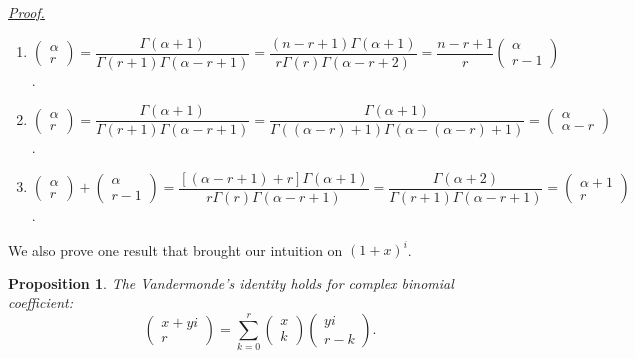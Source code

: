\documentclass[12pt]{article}
\newtheorem*{proposition}{Proposition}
\renewenvironment{proof}[1][Proof]{\begin{snugshade*} \underline{\textit{{#1}.}}\\}{\hfill \qedsymbol \end{snugshade*}}
\begin{document}
    \begin{proof}
        \begin{enumerate}
            \item $\begin{pmatrix}
                \alpha\\r
            \end{pmatrix}=\dfrac{\Gamma(\alpha+1)}{\Gamma(r+1)\Gamma(\alpha-r+1)}=\dfrac{(n-r+1)\Gamma(\alpha+1)}{r\Gamma(r)\Gamma(\alpha-r+2)}=\dfrac{n-r+1}{r}\begin{pmatrix}
                \alpha\\r-1
            \end{pmatrix}$.
            \item $\begin{pmatrix}
                \alpha\\r
            \end{pmatrix}=\dfrac{\Gamma(\alpha+1)}{\Gamma(r+1)\Gamma(\alpha-r+1)}=\dfrac{\Gamma(\alpha+1)}{\Gamma((\alpha-r)+1)\Gamma(\alpha-(\alpha-r)+1)}=\begin{pmatrix}
                \alpha\\\alpha-r
            \end{pmatrix}$.
            \item $\begin{pmatrix}
                \alpha\\r
            \end{pmatrix}+\begin{pmatrix}
                \alpha\\r-1
            \end{pmatrix}=\dfrac{[(\alpha-r+1)+r]\Gamma(\alpha+1)}{r\Gamma(r)\Gamma(\alpha-r+1)}=\dfrac{\Gamma(\alpha+2)}{\Gamma(r+1)\Gamma(\alpha-r+1)}=\begin{pmatrix}
                \alpha+1\\r
            \end{pmatrix}$.
        \end{enumerate}
    \end{proof}

    We also prove one result that brought our intuition on $(1+x)^i$.

    \begin{proposition}
        The Vandermonde's identity holds for complex binomial coefficient: \[\begin{pmatrix}
            x+yi\\r
        \end{pmatrix}=\sum_{k=0}^{r}\begin{pmatrix}
            x\\k
        \end{pmatrix}\begin{pmatrix}
            yi\\r-k
        \end{pmatrix}.\]
    \end{proposition}
\end{document}

